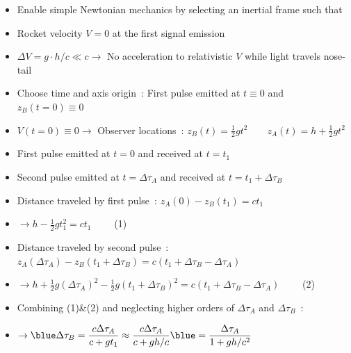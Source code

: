 \Tr
\begin{itemize}
\item Enable simple Newtonian mechanics by selecting an inertial frame such that
\item[] Rocket velocity $V=0$ at the first signal emission
\item[] $\Delta V=g \cdot h/c \ll c \rightarrow$ No acceleration to relativistic $V$ while light travels nose-tail
\item Choose time and axis origin~: First pulse emitted at $t \equiv 0$ and $z_{B}(t=0) \equiv 0$
\item[] $V(t=0) \equiv 0 \rightarrow$ Observer locations~:
        {\blue $z_{B}(t)=\frac{1}{2}gt^{2} \qquad z_{A}(t)=h+\frac{1}{2}gt^{2}$}
\item[] First pulse emitted at $t=0$ and received at $t=t_{1}$
\item[] Second pulse emitted at $t=\Delta\tau_{A}$ and received at $t=t_{1}+\Delta\tau_{B}$
\item Distance traveled by first pulse~: $z_{A}(0)-z_{B}(t_{1})=ct_{1}$
\item[] $\rightarrow h-\frac{1}{2}gt_{1}^{2}=ct_{1} \qquad$ (1)
\item Distance traveled by second pulse~:
      $z_{A}(\Delta\tau_{A})-z_{B}(t_{1}+\Delta\tau_{B})=c(t_{1}+\Delta\tau_{B}-\Delta\tau_{A})$
\item[] $\rightarrow h+\frac{1}{2}g(\Delta\tau_{A})^{2}-\frac{1}{2}g(t_{1}+\Delta\tau_{B})^{2}
         =c(t_{1}+\Delta\tau_{B}-\Delta\tau_{A}) \qquad$ (2)
\item Combining (1)\&(2) and neglecting higher orders of $\Delta\tau_{A}$ and $\Delta\tau_{B}$~:
\item[] $\rightarrow \displaystyle {\blue \Delta\tau_{B}} =\frac{c\Delta\tau_{A}}{c+gt_{1}}
         \approx \frac{c\Delta\tau_{A}}{c+gh/c} {\blue = \frac{\Delta\tau_{A}}{1+gh/c^{2}}}$
\end{itemize}

